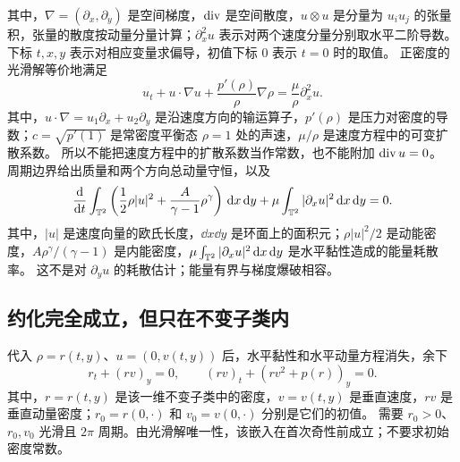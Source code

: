 其中，$\nabla=(\partial_x,\partial_y)$ 是空间梯度，$\operatorname{div}$ 是空间散度，$u\otimes u$ 是分量为 $u_i u_j$ 的张量积，张量的散度按动量分量计算；$\partial_x^2u$ 表示对两个速度分量分别取水平二阶导数。下标 $t,x,y$ 表示对相应变量求偏导，初值下标 $0$ 表示 $t=0$ 时的取值。
正密度的光滑解等价地满足
\begin{equation}\label{eq:primitive}
 u_t+u\cdot\nabla u+\frac{p'(\rho)}{\rho}\nabla\rho
 =\frac{\mu}{\rho}\partial_x^2u.
\end{equation}
其中，$u\cdot\nabla=u_1\partial_x+u_2\partial_y$ 是沿速度方向的输运算子，$p'(\rho)$ 是压力对密度的导数；$c=\sqrt{p'(1)}$ 是常密度平衡态 $\rho=1$ 处的声速，$\mu/\rho$ 是速度方程中的可变扩散系数。
所以不能把速度方程中的扩散系数当作常数，也不能附加 $\operatorname{div} u=0$。
周期边界给出质量和两个方向总动量守恒，以及
\begin{equation}\label{eq:energy}
 \frac{\mathrm d}{\mathrm dt}\int_{\mathbb T^2}
 \left(\frac12\rho|u|^2+\frac{A}{\gamma-1}\rho^\gamma\right)\,\mathrm d x\,\mathrm d y
 +\mu\int_{\mathbb T^2}|\partial_xu|^2\,\mathrm d x\,\mathrm d y=0.
\end{equation}
其中，$|u|$ 是速度向量的欧氏长度，$\dd x\dd y$ 是环面上的面积元；$\rho|u|^2/2$ 是动能密度，$A\rho^\gamma/(\gamma-1)$ 是内能密度，$\mu\int_{\mathbb T^2}|\partial_xu|^2\,\mathrm d x\,\mathrm d y$ 是水平黏性造成的能量耗散率。
这不是对 $\partial_yu$ 的耗散估计；能量有界与梯度爆破相容。

\subsection{约化完全成立，但只在不变子类内}
代入 $\rho=r(t,y)$、$u=(0,v(t,y))$ 后，水平黏性和水平动量方程消失，余下
\begin{equation}\label{eq:1d}
 r_t+(rv)_y=0,\qquad (rv)_t+(rv^2+p(r))_y=0.
\end{equation}
其中，$r=r(t,y)$ 是该一维不变子类中的密度，$v=v(t,y)$ 是垂直速度，$rv$ 是垂直动量密度；$r_0=r(0,\cdot)$ 和 $v_0=v(0,\cdot)$ 分别是它们的初值。
需要 $r_0>0$、$r_0,v_0$ 光滑且 $2\pi$ 周期。由光滑解唯一性，该嵌入在首次奇性前成立；不要求初始密度常数。

